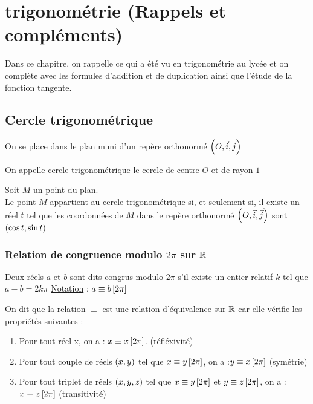 \chapter{trigonométrie (Rappels et compléments)}

\minitoc

Dans ce chapitre, on rappelle ce qui a été vu en trigonométrie au lycée et on complète avec les formules
d’addition et de duplication ainsi que l’étude de la fonction tangente.

\section{Cercle trigonométrique}

On se place dans le plan muni d'un repère orthonormé \(\left(O,\vec{i},\vec{j}\right)\)

\begin{defi}

	On appelle cercle trigonométrique le cercle de centre \(O\) et de rayon \(1\)

\end{defi}

\begin{prop}
	Soit \(M\) un point du plan. \\
	Le point \(M\) appartient au cercle trigonométrique si, et seulement si, il existe un réel \(t\) tel que les coordonnées de \(M\) dans le repère orthonormé \(\left(O,\vec{i},\vec{j}\right)\) sont \(\left(\cos t ; \sin t\right)\)
\end{prop}

\subsection{Relation de congruence modulo \(2\pi\) sur \(\mathbb{R}\)}

\begin{defi}
	Deux réels \(a\) et \(b\) sont dits congrus modulo \(2\pi\) s'il existe un entier relatif \(k\) tel que \(a-b = 2k\pi\)
	\underline{Notation} : \(a \equiv b \left[2 \pi\right] \)
\end{defi}

\begin{defprop}
	On dit que la relation \(\equiv\) est une relation d'équivalence sur \(\mathbb{R}\) car elle vérifie les propriétés suivantes :
	\begin{enumerate}
		\item Pour tout réel x, on a : \(x \equiv x \left[2 \pi\right]\). \hfill (réfléxivité)
		\item Pour tout couple de réels \(\left(x,y\right)\) tel que \( x \equiv y \left[2 \pi\right] \), on a :\( y \equiv x \left[2 \pi\right] \) \hfill (symétrie)
		\item Pour tout triplet de réels \(\left(x,y,z\right)\) tel que \(x \equiv y \left[2 \pi\right] \) et \( y \equiv z \left[2 \pi\right] \), on a : \( x \equiv z \left[2 \pi\right] \) \hfill (transitivité)
	\end{enumerate}
\end{defprop}




